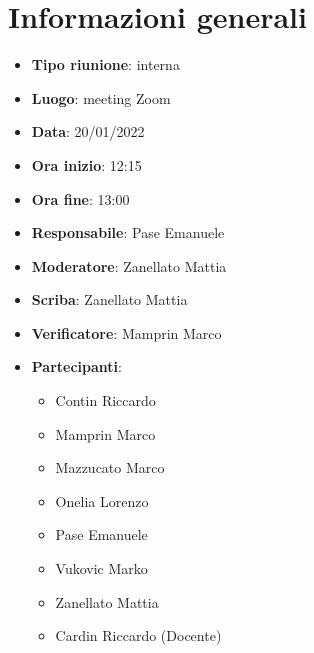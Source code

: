 \section{Informazioni generali}
\begin{itemize}
  \item \textbf{Tipo riunione}: interna
  \item \textbf{Luogo}: meeting Zoom
  \item \textbf{Data}: 20/01/2022
  \item \textbf{Ora inizio}: 12:15
  \item \textbf{Ora fine}: 13:00
  \item \textbf{Responsabile}: Pase Emanuele
  \item \textbf{Moderatore}: Zanellato Mattia
  \item \textbf{Scriba}: Zanellato Mattia
  \item \textbf{Verificatore}: Mamprin Marco
  \item \textbf{Partecipanti}:
  \begin{itemize}
    \item Contin Riccardo
    \item Mamprin Marco
    \item Mazzucato Marco
    \item Onelia Lorenzo
    \item Pase Emanuele
    \item Vukovic Marko
    \item Zanellato Mattia
    \item Cardin Riccardo (Docente)
  \end{itemize}
\end{itemize}
